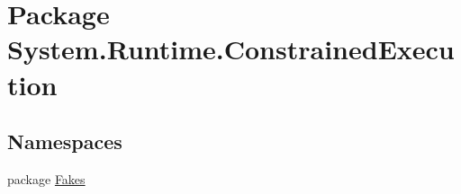\hypertarget{namespace_system_1_1_runtime_1_1_constrained_execution}{\section{Package System.\-Runtime.\-Constrained\-Execution}
\label{namespace_system_1_1_runtime_1_1_constrained_execution}
}
\subsection*{Namespaces}
\begin{DoxyCompactItemize}
\item 
package \hyperlink{namespace_system_1_1_runtime_1_1_constrained_execution_1_1_fakes}{Fakes}
\end{DoxyCompactItemize}
